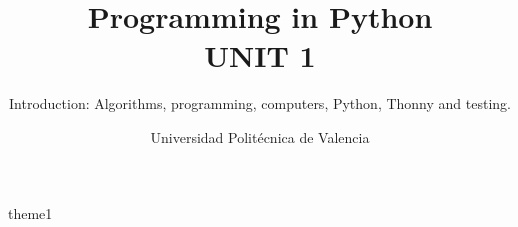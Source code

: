 \documentclass[fontsize=10pt,a4paper]{scrartcl}
\title{Programming in Python\\ UNIT 1}
\subtitle{\Large{Introduction: Algorithms, programming, computers, Python, Thonny and testing.}}
\author{Universidad Politécnica de Valencia}
\date{\academicyear}
\begin{document}
\maketitle
\tableofcontents


{theme1}

\end{document}
